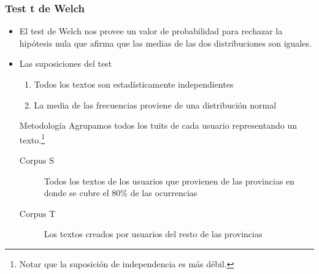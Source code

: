 \begin{frame}[t]\frametitle{Test t de Welch}

    \begin{itemize}
        \item El test de Welch nos provee un valor de probabilidad para rechazar la hipótesis nula que afirma que las medias de las dos distribuciones son iguales.

        \item Las suposiciones del test 
        \begin{enumerate}
            \item Todos los textos son estadísticamente independientes 
            \item La media de las frecuencias proviene de una distribución normal
        \end{enumerate}
        \begin{block}{Metodología}
              Agrupamos todos los tuits de cada usuario representando un texto.\footnote{Notar que la suposición de independencia es más débil.}
        \begin{description}
            \item[Corpus S] Todos los textos de los usuarios que provienen de las provincias en donde se cubre el 80\% de las ocurrencias
            \item[Corpus T] Los textos creados por usuarios del resto de las provincias
        \end{description}

        \end{block}
    \end{itemize}

\end{frame}


